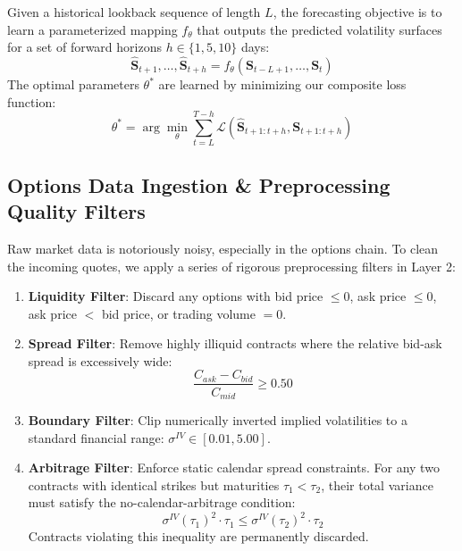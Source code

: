 \documentclass[conference]{IEEEtran}
\begin{document}
Given a historical lookback sequence of length $L$, the forecasting objective is to learn a parameterized mapping $f_\theta$ that outputs the predicted volatility surfaces for a set of forward horizons $h \in \{1, 5, 10\}$ days:
\begin{equation}
\mathbf{\hat{S}}_{t+1}, \dots, \mathbf{\hat{S}}_{t+h} = f_\theta(\mathbf{S}_{t-L+1}, \dots, \mathbf{S}_t)
\end{equation}
The optimal parameters $\theta^*$ are learned by minimizing our composite loss function:
\begin{equation}
\theta^* = \arg\min_\theta \sum_{t=L}^{T-h} \mathcal{L}(\mathbf{\hat{S}}_{t+1:t+h}, \mathbf{S}_{t+1:t+h})
\end{equation}

\subsection{Options Data Ingestion & Preprocessing Quality Filters}

Raw market data is notoriously noisy, especially in the options chain. To clean the incoming quotes, we apply a series of rigorous preprocessing filters in Layer 2:
\begin{enumerate}
    \item \textbf{Liquidity Filter}: Discard any options with bid price $\le 0$, ask price $\le 0$, ask price $<$ bid price, or trading volume $= 0$.
    \item \textbf{Spread Filter}: Remove highly illiquid contracts where the relative bid-ask spread is excessively wide:
    \begin{equation}
    \frac{C_{ask} - C_{bid}}{C_{mid}} \ge 0.50
    \end{equation}
    \item \textbf{Boundary Filter}: Clip numerically inverted implied volatilities to a standard financial range: $\sigma^{IV} \in [0.01, 5.00]$.
    \item \textbf{Arbitrage Filter}: Enforce static calendar spread constraints. For any two contracts with identical strikes but maturities $\tau_1 < \tau_2$, their total variance must satisfy the no-calendar-arbitrage condition:
    \begin{equation}
    \sigma^{IV}(\tau_1)^2 \cdot \tau_1 \le \sigma^{IV}(\tau_2)^2 \cdot \tau_2
    \end{equation}
    Contracts violating this inequality are permanently discarded.
\end{enumerate}
\end{document}
